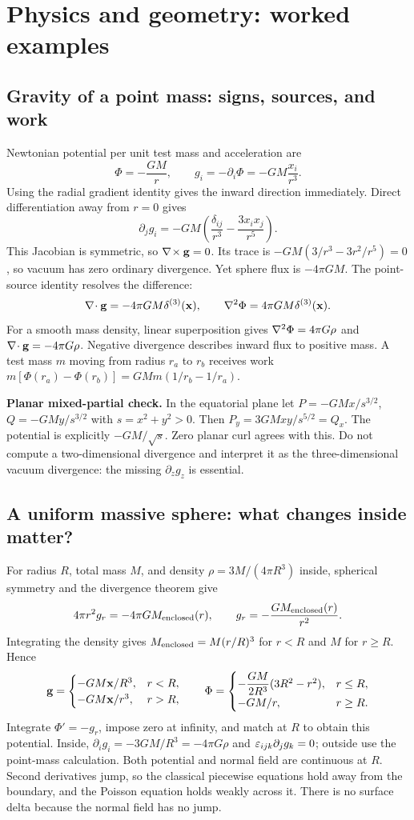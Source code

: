 \documentclass[11pt]{article}
\newcounter{identity}\newcommand{\identity}[2]{\refstepcounter{identity}\subsection*{\textcolor{forest}{\theidentity. #1}}\addcontentsline{toc}{subsection}{\theidentity. #1}\[ #2 \]}
\begin{document}
\section{Physics and geometry: worked examples}
\subsection{Gravity of a point mass: signs, sources, and work}
Newtonian potential per unit test mass and acceleration are
\[\Phi=-\frac{GM}{r},\qquad g_i=-\partial_i\Phi=-GM\frac{x_i}{r^3}.\]
Using the radial gradient identity gives the inward direction immediately. Direct differentiation away from $r=0$ gives
\[\partial_jg_i=-GM\left(\frac{\delta_{ij}}{r^3}-\frac{3x_ix_j}{r^5}\right).\]
This Jacobian is symmetric, so $\nabla\!\times\mathbf g=0$. Its trace is $-GM(3/r^3-3r^2/r^5)=0$, so vacuum has zero ordinary divergence. Yet sphere flux is $-4\pi GM$. The point-source identity resolves the difference:
\[\nabla\!\cdot\mathbf g=-4\pi GM\delta^{(3)}(\mathbf x),\qquad\nabla^2\Phi=4\pi GM\delta^{(3)}(\mathbf x).\]
For a smooth mass density, linear superposition gives $\nabla^2\Phi=4\pi G\rho$ and $\nabla\!\cdot\mathbf g=-4\pi G\rho$. Negative divergence describes inward flux to positive mass. A test mass $m$ moving from radius $r_a$ to $r_b$ receives work $m[\Phi(r_a)-\Phi(r_b)]=GMm(1/r_b-1/r_a)$.

\textbf{Planar mixed-partial check.} In the equatorial plane let $P=-GMx/s^{3/2}$, $Q=-GMy/s^{3/2}$ with $s=x^2+y^2>0$. Then $P_y=3GMxy/s^{5/2}=Q_x$. The potential is explicitly $-GM/\sqrt{s}$. Zero planar curl agrees with this. Do not compute a two-dimensional divergence and interpret it as the three-dimensional vacuum divergence: the missing $\partial_z g_z$ is essential.

\subsection{A uniform massive sphere: what changes inside matter?}
For radius $R$, total mass $M$, and density $\rho=3M/(4\pi R^3)$ inside, spherical symmetry and the divergence theorem give
\[4\pi r^2g_r=-4\pi G M_{\rm enclosed}(r),\qquad g_r=-\frac{GM_{\rm enclosed}(r)}{r^2}.\]
Integrating the density gives $M_{\rm enclosed}=M(r/R)^3$ for $r<R$ and $M$ for $r\ge R$. Hence
\[\mathbf g=\begin{cases}-GM\mathbf x/R^3,&r<R,\\-GM\mathbf x/r^3,&r>R,\end{cases}\qquad
\Phi=\begin{cases}-\dfrac{GM}{2R^3}(3R^2-r^2),&r\le R,\\-GM/r,&r\ge R.\end{cases}\]
Integrate $\Phi'=-g_r$, impose zero at infinity, and match at $R$ to obtain this potential. Inside, $\partial_i g_i=-3GM/R^3=-4\pi G\rho$ and $\varepsilon_{ijk}\partial_jg_k=0$; outside use the point-mass calculation. Both potential and normal field are continuous at $R$. Second derivatives jump, so the classical piecewise equations hold away from the boundary, and the Poisson equation holds weakly across it. There is no surface delta because the normal field has no jump.
\end{document}
